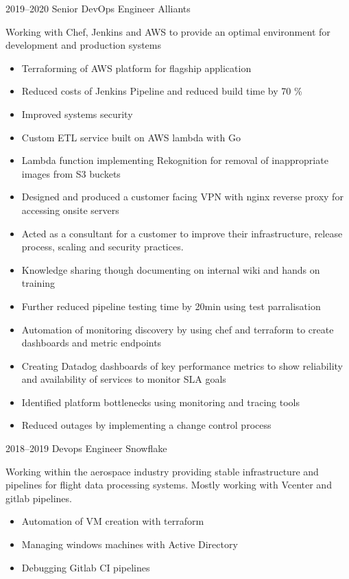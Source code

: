 \documentclass[]{friggeri-cv-a4}
\begin{document}
\begin{entrylist}
   \entry
  	{2019--2020}
  	{Senior DevOps Engineer}
  	{Alliants}
  	{
      Working with Chef, Jenkins and AWS to provide an optimal environment for development and production systems
      \begin{itemize}
        \item Terraforming of AWS platform for flagship application
        \item Reduced costs of Jenkins Pipeline and reduced build time by 70 \%
        \item Improved systems security
        \item Custom ETL service built on AWS lambda with Go
        \item Lambda function implementing Rekognition for removal of inappropriate images from S3 buckets
        \item Designed and produced a customer facing VPN with nginx reverse proxy for accessing onsite servers
        \item Acted as a consultant for a customer to improve their infrastructure, release process, scaling and security practices. 
        \item Knowledge sharing though documenting on internal wiki and hands on training
        \item Further reduced pipeline testing time by 20min using test parralisation
        \item Automation of monitoring discovery by using chef and terraform to create dashboards and metric endpoints
        \item Creating Datadog dashboards of key performance metrics to show reliability and availability of services to monitor SLA goals
        \item Identified platform bottlenecks using monitoring and tracing tools
        \item Reduced outages by implementing a change control process
      \end{itemize}
    }
   \entry
  	{2018--2019}
  	{Devops Engineer}
  	{Snowflake}
  	{
      Working within the aerospace industry providing stable infrastructure and pipelines for flight data processing systems. Mostly working with Vcenter and gitlab pipelines.
      \begin{itemize}
        \item Automation of VM creation with terraform
        \item Managing windows machines with Active Directory
        \item Debugging Gitlab CI pipelines

\end{itemize}}
\end{entrylist}
\end{document}
